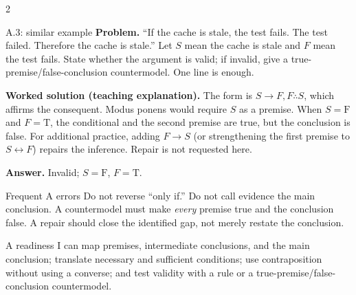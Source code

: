 \documentclass[10pt]{extarticle}
\begin{document}
\begin{multicols}{2}
\begin{workedbox}{A.3: similar example}
\textbf{Problem.} ``If the cache is stale, the test fails. The test failed. Therefore the cache is stale.'' Let $S$ mean the cache is stale and $F$ mean the test fails. State whether the argument is valid; if invalid, give a true-premise/false-conclusion countermodel. One line is enough.

\textbf{Worked solution (teaching explanation).} The form is $S\to F,F\therefore S$, which affirms the consequent. Modus ponens would require $S$ as a premise. When $S=\mathrm F$ and $F=\mathrm T$, the conditional and the second premise are true, but the conclusion is false. For additional practice, adding $F\to S$ (or strengthening the first premise to $S\leftrightarrow F$) repairs the inference. Repair is not requested here.

\textbf{Answer.} Invalid; $S=\mathrm F$, $F=\mathrm T$.
\end{workedbox}

\begin{warningbox}{Frequent A errors}
Do not reverse ``only if.'' Do not call evidence the main conclusion. A
countermodel must make \emph{every} premise true and the conclusion false. A
repair should close the identified gap, not merely restate the conclusion.
\end{warningbox}

\begin{checklistbox}{A readiness}
I can map premises, intermediate conclusions, and the main conclusion; translate
necessary and sufficient conditions; use contraposition without using a converse;
and test validity with a rule or a true-premise/false-conclusion countermodel.
\end{checklistbox}
\end{multicols}

\clearpage
\small
\end{document}
